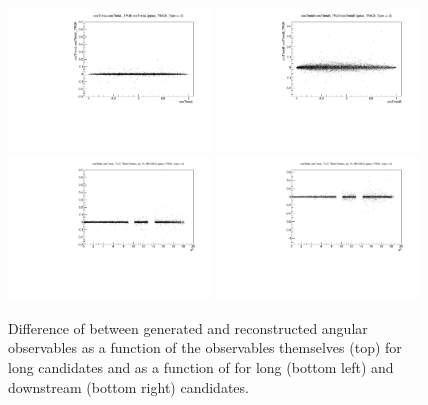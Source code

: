 \begin{figure}
\centering
\includegraphics[width=0.48\textwidth]{Lmumu/figs/resolution/RmT_vs_cosThetaL_LL.pdf}
\includegraphics[width=0.48\textwidth]{Lmumu/figs/resolution/RmT_vs_cosThetaB_LL.pdf}
\includegraphics[width=0.48\textwidth]{Lmumu/figs/resolution/RmTcosThetaL_vs_q2_LL.pdf}
\includegraphics[width=0.48\textwidth]{Lmumu/figs/resolution/RmTcosThetaL_vs_q2_DD.pdf}
 \caption{Difference of between generated and reconstructed angular observables as a function of 
 the observables themselves (top) for long candidates and as a function of \qsq for 
 long (bottom left) and downstream (bottom right) candidates.}
\label{fig:resolutionvsq2ang}
\end{figure}

